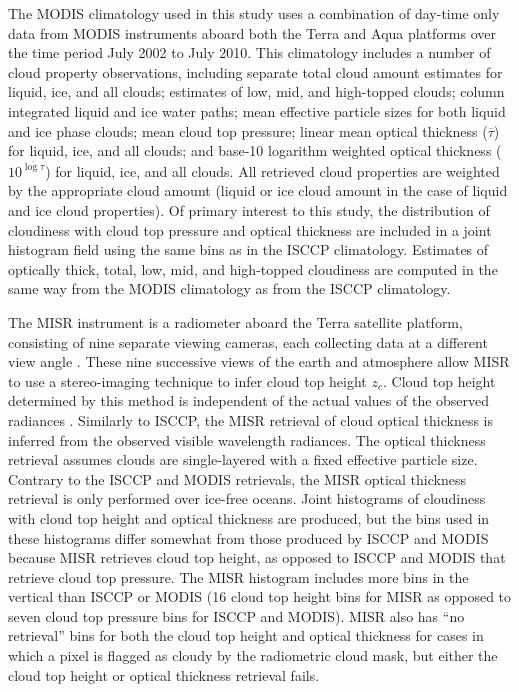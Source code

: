 The MODIS climatology used in this study uses a combination of day-time only data from MODIS instruments aboard both the Terra and Aqua platforms over the time period July 2002 to July 2010. This climatology includes a number of cloud property observations, including separate total cloud amount estimates for liquid, ice, and all clouds; estimates of low, mid, and high-topped clouds; column integrated liquid and ice water paths; mean effective particle sizes for both liquid and ice phase clouds; mean cloud top pressure; linear mean optical thickness ($\overline{\tau}$) for liquid, ice, and all clouds; and base-10 logarithm weighted optical thickness ($10^{\overline{\log{\tau}}}$) for liquid, ice, and all clouds. All retrieved cloud properties are weighted by the appropriate cloud amount (liquid or ice cloud amount in the case of liquid and ice cloud properties). Of primary interest to this study, the distribution of cloudiness with cloud top pressure and optical thickness are included in a joint histogram field using the same bins as in the ISCCP climatology. Estimates of optically thick, total, low, mid, and high-topped cloudiness are computed in the same way from the MODIS climatology as from the ISCCP climatology.

The MISR instrument is a radiometer aboard the Terra satellite platform, consisting of nine separate viewing cameras, each collecting data at a different view angle \citep{diner_et_al_1998,diner_et_al_2002,diner_et_al_2005}. These nine successive views of the earth and atmosphere allow MISR to use a stereo-imaging technique to infer cloud top height $z_c$. Cloud top height determined by this method is independent of the actual values of the observed radiances \citep{moroney_et_al_2002,muller_et_al_2002}. Similarly to ISCCP, the MISR retrieval of cloud optical thickness is inferred from the observed visible wavelength radiances. The optical thickness retrieval assumes clouds are single-layered with a fixed effective particle size. Contrary to the ISCCP and MODIS retrievals, the MISR optical thickness retrieval is only performed over ice-free oceans. Joint histograms of cloudiness with cloud top height and optical thickness are produced, but the bins used in these histograms differ somewhat from those produced by ISCCP and MODIS because MISR retrieves cloud top height, as opposed to ISCCP and MODIS that retrieve cloud top pressure. The MISR histogram includes more bins in the vertical than ISCCP or MODIS (16 cloud top height bins for MISR as opposed to seven cloud top pressure bins for ISCCP and MODIS). MISR also has ``no retrieval'' bins for both the cloud top height and optical thickness for cases in which a pixel is flagged as cloudy by the radiometric cloud mask, but either the cloud top height or optical thickness retrieval fails.


